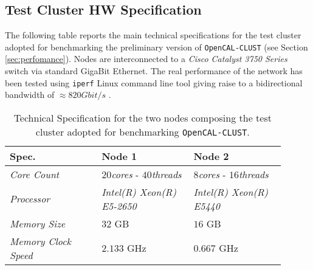 \subsection{Test Cluster HW Specification}
\label{app:tech_spec_nodes}
The following table reports the main technical specifications for the test cluster adopted for benchmarking the preliminary version of  \texttt{OpenCAL-CLUST} (see Section \ref{sec:perfomance}).
Nodes are interconnected to a \textit{Cisco Catalyst 3750 Series} switch via standard GigaBit Ethernet.
The real performance of the network has been tested using \texttt{iperf} Linux command line tool giving raise to a bidirectional  bandwidth of $\approx 820 Gbit/s$  .
\begin{table}[H]
	\centering
	\caption{Technical Specification for the two nodes composing the test cluster adopted for benchmarking \texttt{OpenCAL-CLUST}.}
	\label{tab:tech_nodes}
	\begin{tabular}{m{0.3\linewidth} m{0.3\linewidth} m{0.3\linewidth}}
		\toprule
		{\textbf{Spec.}} & {\textbf{Node 1}} & {\textbf{Node 2}} \\
		\midrule
		\textit{Core Count}                & $20$\textit{cores} - $40$\textit{threads}   & $8$\textit{cores} - $16$\textit{threads}   \\
		\textit{Processor}                & \textit{Intel(R) Xeon(R) E5-2650}   & \textit{Intel(R) Xeon(R) E5440}   \\
		
		
		\midrule
		
		\textit{Memory Size}                & $32$ \si{GB}  & $16$ \si{GB}    \\
		
		\textit{Memory Clock Speed}                & $2.133$ \si{GHz}   & $0.667$ \si{GHz}    \\
		
		
		\bottomrule
	\end{tabular}
\end{table}



